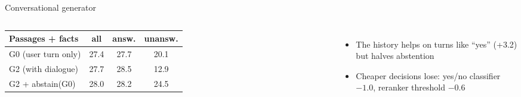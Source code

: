 \documentclass[aspectratio=169,11pt]{beamer}
\newcommand{\up}[1]{{\color{green!45!black}#1}}
\newcommand{\down}[1]{{\color{accent}#1}}
\begin{document}
\begin{frame}[label=conv]{Conversational generator}
\begin{columns}[c]
\small
\begin{tabular}{lccc}
\toprule
Passages + facts & all & answ. & unansw. \\
\midrule
G0 (user turn only) & 27.4 & 27.7 & 20.1 \\ %
G2 (with dialogue) & 27.7 & \up{28.5} & \down{12.9} \\ %
G2 + abstain(G0) & \up{28.0} & 28.2 & 24.5 \\ %
\bottomrule
\end{tabular}

\vspace{3mm}
\footnotesize
\begin{itemize}
\item The history helps on turns like ``yes'' (+3.2) but halves abstention %
\item Cheaper decisions lose: yes/no classifier $-1.0$, reranker threshold $-0.6$ %
\end{itemize}
\end{columns}
\end{frame}
\end{document}
